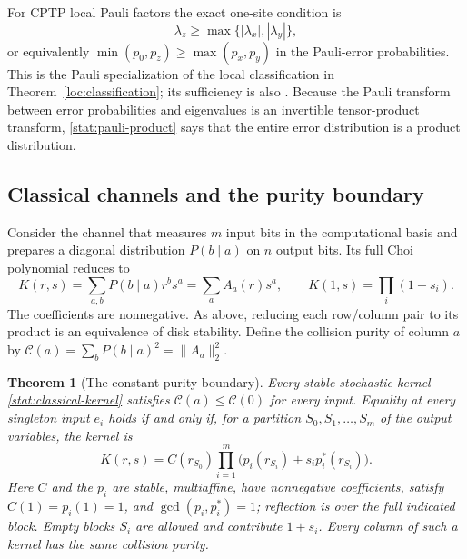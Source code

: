 \documentclass[reqno]{amsart}
\newtheorem{theorem}{Theorem}[section]
\theoremstyle{definition}
\theoremstyle{remark}
\begin{document}
For CPTP local Pauli factors the exact one-site condition is
\[
 \lambda_z\ge\max\{|\lambda_x|,|\lambda_y|\},
\]
or equivalently
\(\min(p_0,p_z)\ge\max(p_x,p_y)\) in the Pauli-error
probabilities.  This is the Pauli specialization of the local
classification in Theorem~\ref{loc:classification}; its
sufficiency is also \cite[Theorem~3]{WBG26}.
Because the Pauli transform between error probabilities and
eigenvalues is an invertible tensor-product transform,
\eqref{stat:pauli-product} says that the entire error
distribution is a product distribution.

\subsection{Classical channels and the purity boundary}

Consider the channel that measures \(m\) input bits in the
computational basis and prepares a diagonal distribution
\(P(b\mid a)\) on \(n\) output bits.  Its full Choi
polynomial reduces to
\begin{equation}
 K(r,s)=\sum_{a,b}P(b\mid a)r^bs^a=\sum_aA_a(r)s^a,
 \qquad K(1,s)=\prod_i(1+s_i).
 \label{stat:classical-kernel}
\end{equation}
The coefficients are nonnegative.  As above, reducing each
row/column pair to its product is an equivalence of disk
stability.  Define the collision purity of column \(a\) by
\(\mathcal C(a)=\sum_bP(b\mid a)^2=\|A_a\|_2^2\).

\begin{theorem}[The constant-purity boundary]
\label{stat:classical-purity}
Every stable stochastic kernel \eqref{stat:classical-kernel}
satisfies \(\mathcal C(a)\le\mathcal C(0)\) for every input.
Equality at every singleton input \(e_i\) holds if and only
if, for a partition \(S_0,S_1,\ldots,S_m\) of the output
variables, the kernel is
\begin{equation}
 K(r,s)=C(r_{S_0})\prod_{i=1}^m
                 \bigl(p_i(r_{S_i})+s_i p_i^*(r_{S_i})\bigr).
 \label{stat:classical-purity-form}
\end{equation}
Here \(C\) and the \(p_i\) are stable, multiaffine, have
nonnegative coefficients, satisfy \(C(1)=p_i(1)=1\), and
\(\gcd(p_i,p_i^*)=1\); reflection is over the full indicated
block.  Empty blocks \(S_i\) are allowed and contribute
\(1+s_i\).  Every column of such a kernel has the same
collision purity.
\end{theorem}
\end{document}
